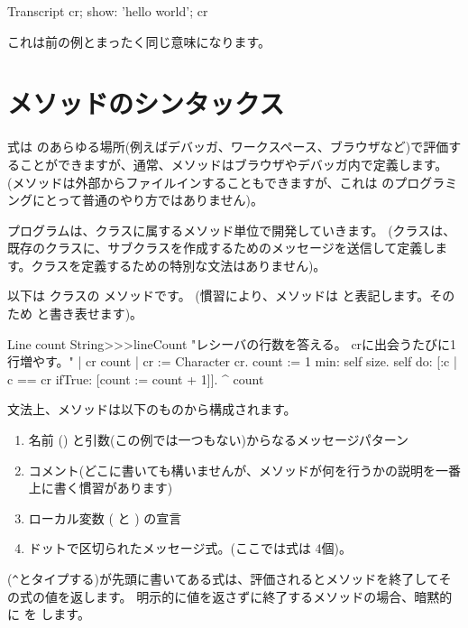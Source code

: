 \documentclass[a4paper,10pt,twoside]{book}
\begin{document}
\begin{code}{}
Transcript cr;
    show: 'hello world';
    cr
\end{code}
これは前の例とまったく同じ意味になります。

\section{メソッドのシンタックス}

式は \pharo のあらゆる場所(例えばデバッガ、ワークスペース、ブラウザなど)で評価することができますが、通常、メソッドはブラウザやデバッガ内で定義します。
(メソッドは外部からファイルインすることもできますが、これは \pharo のプログラミングにとって普通のやり方ではありません)。

プログラムは、クラスに属するメソッド単位で開発していきます。
(クラスは、既存のクラスに、サブクラスを作成するためのメッセージを送信して定義します。クラスを定義するための特別な文法はありません)。

以下は  クラスの  メソッドです。
(慣習により、メソッドは  と表記します。そのため  と書き表せます)。

\begin{method}[lineCount]{Line count}
String>>>lineCount
   "レシーバの行数を答える。
   crに出会うたびに1行増やす。"
   | cr count |
   cr := Character cr.
   count := 1 min: self size.
   self do:
      [:c | c == cr ifTrue: [count := count + 1]].
   ^ count
\end{method}

文法上、メソッドは以下のものから構成されます。
\begin{enumerate}
  \item 名前 (\ie {}) と引数(この例では一つもない)からなるメッセージパターン
  \item コメント(どこに書いても構いませんが、メソッドが何を行うかの説明を一番上に書く慣習があります)
  \item ローカル変数 (\ie {} と ) の宣言
  \item ドットで区切られたメッセージ式。(ここでは式は 4個)。
\end{enumerate}

\ct{^}(\verb|^|とタイプする)が先頭に書いてある式は、評価されるとメソッドを終了してその式の値を返します。
明示的に値を返さずに終了するメソッドの場合、暗黙的に  を します。
\end{document}
